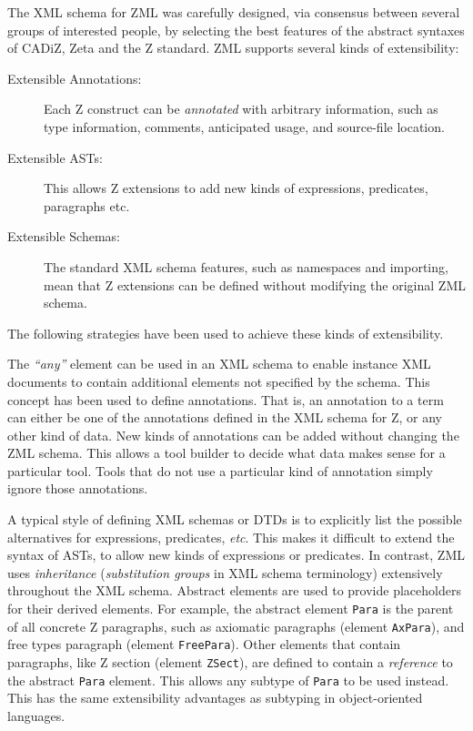 \documentclass{llncs}
\newcommand{\Element}[1]{\texttt{#1}}
\begin{document}
  The XML schema for ZML was carefully designed, via consensus between
  several groups of interested people, by selecting the best features
  of the abstract syntaxes of CADiZ, Zeta and the Z standard.
  ZML supports several kinds of extensibility:
  \begin{description}
  \item[Extensible Annotations:] Each Z construct can be \emph{annotated}
    with arbitrary information, such as type information, comments,
    anticipated usage, and source-file location.
  \item[Extensible ASTs:] This allows Z extensions to add new kinds
    of expressions, predicates, paragraphs etc.
  \item[Extensible Schemas:] The standard XML schema features, such as
    name\-spa\-ces and importing, mean that Z extensions can be defined without
    modifying the original ZML schema.
  \end{description}
  The following strategies have been used to achieve these kinds
  of extensibility.

  The \textit{``any''} element can be used in an XML schema to enable
  instance XML documents to contain additional elements not specified
  by the schema.  This concept has been used to define annotations.
  That is, an annotation to a term can either be one of the
  annotations defined in the XML schema for Z, or any other kind of
  data.  New kinds of annotations can be added without changing the ZML
  schema.  This allows a tool builder to decide what data makes sense
  for a particular tool.  Tools that do not use a particular kind
  of annotation simply ignore those annotations.

  A typical style of defining XML schemas or DTDs is to explicitly
  list the possible alternatives for expressions, predicates, \textit{etc}.
  This makes it difficult to extend the syntax of ASTs, to allow new
  kinds of expressions or
  predicates.  In contrast, ZML uses \emph{inheritance}
  (\emph{substitution groups} in XML schema terminology) extensively
  throughout the XML schema.  Abstract elements are used to provide
  placeholders for their derived elements.  For example, the abstract
  element \Element{Para} is the parent of all concrete Z paragraphs,
  such as axiomatic paragraphs (element \Element{AxPara}), and free
  types paragraph (element \Element{FreePara}).  Other elements that
  contain paragraphs, like Z section (element \Element{ZSect}), are
  defined to contain a \emph{reference} to the abstract \Element{Para}
  element.  This allows any subtype of \Element{Para} to be used
  instead.  This has the same extensibility advantages as subtyping
  in object-oriented languages.
\end{document}
